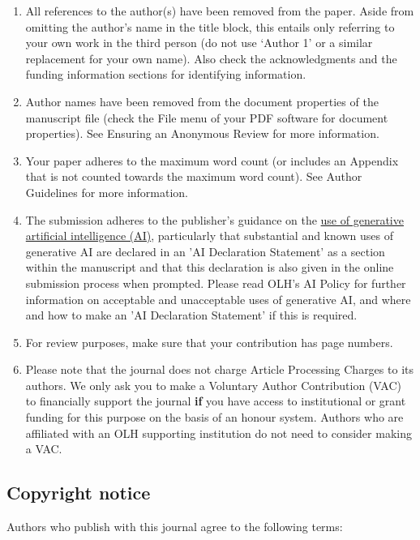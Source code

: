 \documentclass[charis,linguex]{glossa}
\begin{document}
\begin{enumerate}[label=\arabic*.]
\item All references to the author(s) have been removed from the paper. Aside from omitting the author’s name in the title block, this entails only referring to your own work in the third person (do not use ‘Author 1’ or a similar replacement for your own name). Also check the acknowledgments and the funding information sections for identifying information.
\item Author names have been removed from the document properties of the manuscript file (check the File menu of your PDF software for document properties). See Ensuring an Anonymous Review for more information.
\item Your paper adheres to the maximum word count (or includes an Appendix that is not counted towards the maximum word count). See Author Guidelines for more information.
\item The submission adheres to the publisher's guidance on the \href{https://www.openlibhums.org/site/ai-policy/}{use of generative artificial intelligence (AI)}, particularly that substantial and known uses of generative AI are declared in an 'AI Declaration Statement' as a section within the manuscript and that this declaration is also given in the online submission process when prompted. Please read OLH's AI Policy for further information on acceptable and unacceptable uses of generative AI, and where and how to make an 'AI Declaration Statement' if this is required.
\item For review purposes, make sure that your contribution has page numbers.
\item Please note that the journal does not charge Article Processing Charges to its authors. We only ask you to make a Voluntary Author Contribution (VAC) to financially support the journal \textbf{if} you have access to institutional or grant funding for this purpose on the basis of an honour system. Authors who are affiliated with an OLH supporting institution do not need to consider making a VAC. 
\end{enumerate}

\subsection{Copyright notice}

Authors who publish with this journal agree to the following terms:
\end{document}

